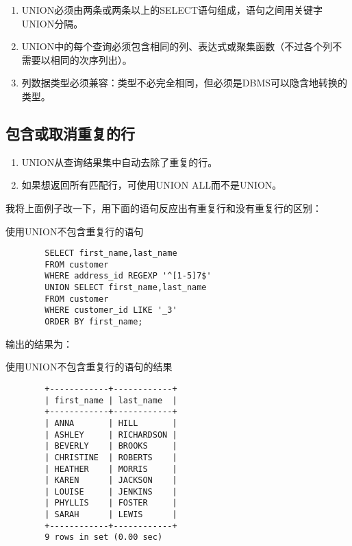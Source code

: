 \documentclass[UTF8]{article}
\begin{document}
\begin{orangebox}[frametitle={Tips 17.2.1 UNION规则}]
        \begin{enumerate}
                \item UNION必须由两条或两条以上的SELECT语句组成，语句之间用关键字UNION分隔。
                \item UNION中的每个查询必须包含相同的列、表达式或聚集函数（不过各个列不需要以相同的次序列出）。
                \item 列数据类型必须兼容：类型不必完全相同，但必须是DBMS可以隐含地转换的类型。
        \end{enumerate}       
\end{orangebox}

\subsection{包含或取消重复的行}

\begin{orangebox}[frametitle={Tips 17.3.1 UNION包含或取消重复的行}]
        \begin{enumerate}
                \item UNION从查询结果集中自动去除了重复的行。
                \item 如果想返回所有匹配行，可使用UNION ALL而不是UNION。
        \end{enumerate}       
\end{orangebox}

我将上面例子改一下，用下面的语句反应出有重复行和没有重复行的区别：

\begin{listing}[H]
        \caption{使用UNION不包含重复行的语句}
	\label{code:useunionunrepeatclause}
\begin{verbatim}
        SELECT first_name,last_name 
        FROM customer 
        WHERE address_id REGEXP '^[1-5]7$' 
        UNION SELECT first_name,last_name 
        FROM customer 
        WHERE customer_id LIKE '_3' 
        ORDER BY first_name;
\end{verbatim}
\end{listing}

输出的结果为：

\begin{listing}[H]
	\caption{使用UNION不包含重复行的语句的结果}
	\label{code:useunionunrepeatclauseresult}
\begin{verbatim}
        +------------+------------+
        | first_name | last_name  |
        +------------+------------+
        | ANNA       | HILL       |
        | ASHLEY     | RICHARDSON |
        | BEVERLY    | BROOKS     |
        | CHRISTINE  | ROBERTS    |
        | HEATHER    | MORRIS     |
        | KAREN      | JACKSON    |
        | LOUISE     | JENKINS    |
        | PHYLLIS    | FOSTER     |
        | SARAH      | LEWIS      |
        +------------+------------+
        9 rows in set (0.00 sec)
\end{verbatim}
\end{listing}
\end{document}
